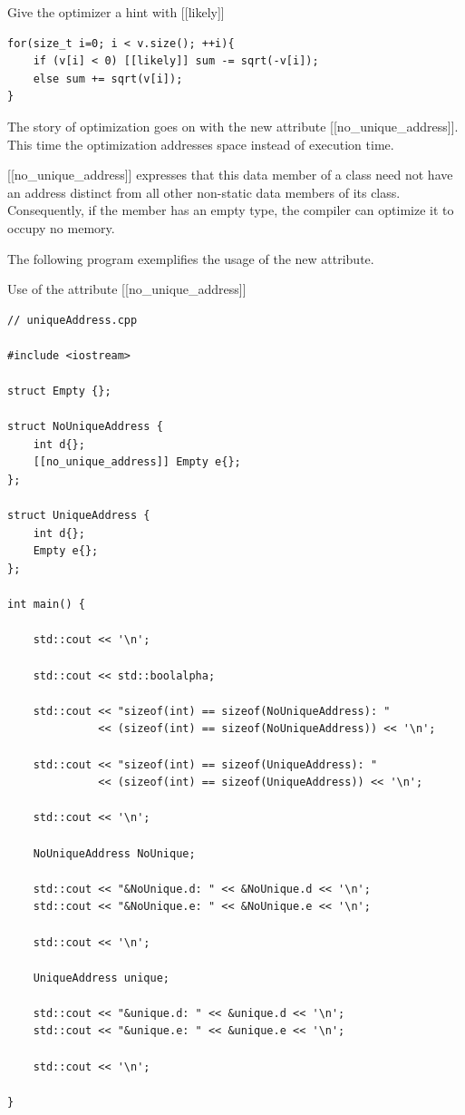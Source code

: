 \noindent
Give the optimizer a hint with [[likely]]
\begin{lstlisting}[style=styleCXX]
for(size_t i=0; i < v.size(); ++i){
	if (v[i] < 0) [[likely]] sum -= sqrt(-v[i]);
	else sum += sqrt(v[i]);
}
\end{lstlisting}

The story of optimization goes on with the new attribute [[no\_unique\_address]]. This time the optimization addresses space instead of execution time.


[[no\_unique\_address]] expresses that this data member of a class need not have an address distinct from all other non-static data members of its class. Consequently, if the member has an empty type, the compiler can optimize it to occupy no memory.

The following program exemplifies the usage of the new attribute.

\noindent
Use of the attribute [[no\_unique\_address]]
\begin{lstlisting}[style=styleCXX]
// uniqueAddress.cpp

#include <iostream>

struct Empty {};

struct NoUniqueAddress {
	int d{};
	[[no_unique_address]] Empty e{};
};

struct UniqueAddress {
	int d{};
	Empty e{};
};

int main() {

	std::cout << '\n';
	
	std::cout << std::boolalpha;
	
	std::cout << "sizeof(int) == sizeof(NoUniqueAddress): "
			  << (sizeof(int) == sizeof(NoUniqueAddress)) << '\n';
	
	std::cout << "sizeof(int) == sizeof(UniqueAddress): "
			  << (sizeof(int) == sizeof(UniqueAddress)) << '\n';
	
	std::cout << '\n';
	
	NoUniqueAddress NoUnique;
	
	std::cout << "&NoUnique.d: " << &NoUnique.d << '\n';
	std::cout << "&NoUnique.e: " << &NoUnique.e << '\n';
	
	std::cout << '\n';
	
	UniqueAddress unique;
	
	std::cout << "&unique.d: " << &unique.d << '\n';
	std::cout << "&unique.e: " << &unique.e << '\n';
	
	std::cout << '\n';

}
\end{lstlisting}

